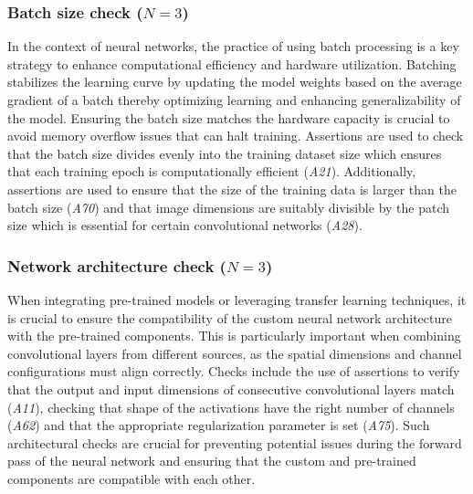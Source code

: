 \subsubsection{Batch size check ($N = 3$)}

In the context of neural networks, the practice of using batch processing is a key strategy to enhance computational efficiency and hardware utilization. Batching stabilizes the learning curve by updating the model weights based on the average gradient of a batch thereby optimizing learning and enhancing generalizability of the model. Ensuring the batch size matches the hardware capacity is crucial to avoid memory overflow issues that can halt training. Assertions are used to check that the batch size divides evenly into the training dataset size which ensures that each training epoch is computationally efficient (\emph{A21}). Additionally, assertions are used to ensure that the size of the training data is larger than the batch size (\emph{A70}) and that image dimensions are suitably divisible by the patch size which is essential for certain convolutional networks (\emph{A28}).


\subsubsection{Network architecture check ($N = 3$)}

When integrating pre-trained models or leveraging transfer learning techniques, it is crucial to ensure the compatibility of the custom neural network architecture with the pre-trained components. This is particularly important when combining convolutional layers from different sources, as the spatial dimensions and channel configurations must align correctly. Checks include the use of assertions to verify that the output and input dimensions of consecutive convolutional layers match (\emph{A11}), checking that shape of the activations have the right number of channels (\emph{A62}) and that the appropriate regularization parameter is set (\emph{A75}). Such architectural checks are crucial for preventing potential issues during the forward pass of the neural network and ensuring that the custom and pre-trained components are compatible with each other.

